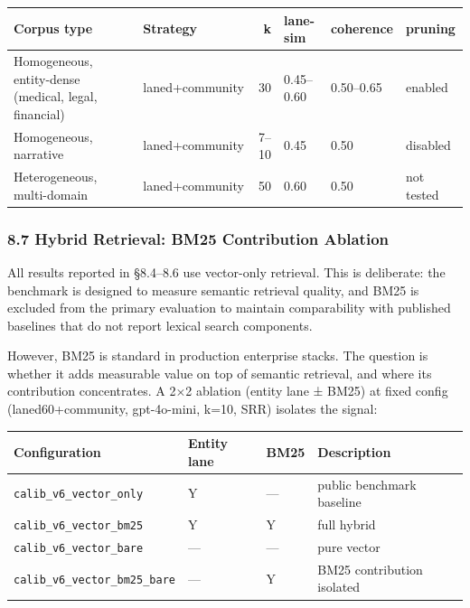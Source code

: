 \begin{small}
\setlength{\tabcolsep}{4pt}
\begin{longtable}{p{2.1in}p{1.0in}rp{0.6in}p{0.6in}p{0.6in}}
\toprule
\textbf{Corpus type} & \textbf{Strategy} & \textbf{k} & \textbf{lane-sim} & \textbf{coherence} & \textbf{pruning} \\
\midrule
\endhead
Homogeneous, entity-dense (medical, legal, financial) & laned+community & 30 & 0.45--0.60 & 0.50--0.65 & enabled \\
Homogeneous, narrative & laned+community & 7--10 & 0.45 & 0.50 & disabled \\
Heterogeneous, multi-domain & laned+community & 50 & 0.60 & 0.50 & not tested \\
\bottomrule
\end{longtable}
\end{small}

\subsubsection{8.7 Hybrid Retrieval: BM25 Contribution Ablation}\label{hybrid-retrieval-bm25-contribution-ablation}

All results reported in §8.4--8.6 use vector-only retrieval. This is deliberate: the benchmark is designed to measure semantic retrieval quality, and BM25 is excluded from the primary evaluation to maintain comparability with published baselines that do not report lexical search components.

However, BM25 is standard in production enterprise stacks. The question is whether it adds measurable value on top of semantic retrieval, and where its contribution concentrates. A 2×2 ablation (entity lane ± BM25) at fixed config (laned60+community, gpt-4o-mini, k=10, SRR) isolates the signal:

\begin{small}
\setlength{\tabcolsep}{4pt}
\begin{longtable}{p{1.8in}p{0.7in}p{0.5in}p{2.8in}}
\toprule
\textbf{Configuration} & \textbf{Entity lane} & \textbf{BM25} & \textbf{Description} \\
\midrule
\endhead
\texttt{calib\_v6\_vector\_only} & Y & — & public benchmark baseline \\
\texttt{calib\_v6\_vector\_bm25} & Y & Y & full hybrid \\
\texttt{calib\_v6\_vector\_bare} & — & — & pure vector \\
\texttt{calib\_v6\_vector\_bm25\_bare} & — & Y & BM25 contribution isolated \\
\bottomrule
\end{longtable}
\end{small}


